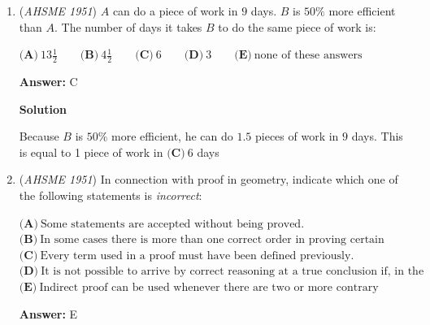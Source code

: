 \begin{enumerate}
\textbf{Solution 1}

At $2:15$, the minute hand points directly at $3$, while the hour hand points $\frac{1}{4}$ of the way from $2$ to $3$.  The angle between any two numbers on the clock is $\frac{360^{\circ}}{12} = 30^{\circ}$, so the angle between the hands at $2:15$ is $\frac{3}{4} \cdot 30^{\circ} = \boxed{\textbf{(C)}\ 22\frac{1}{2}^{\circ}}$.

 



\textbf{Solution 2}

Using the formula $\frac{|60h-11m|}{2}$, where $h$ is the hour time and $m$ is the minute time, we get that the angle is $\frac{|60(2)-11(15)|}{2}=\frac{|120-165|}{2}=\frac{45}{2}=\boxed{\textbf{(C)}\ 22\frac {1}{2}^{\circ} }$



	\item (\textit{AHSME 1951}) $A$ can do a piece of work in $9$ days. $B$ is $50\%$ more efficient than $A$. The number of days it takes $B$ to do the same piece of work is:


 $\textbf{(A)}\ 13\frac {1}{2} \qquad\textbf{(B)}\ 4\frac {1}{2} \qquad\textbf{(C)}\ 6 \qquad\textbf{(D)}\ 3 \qquad\textbf{(E)}\ \text{none of these answers}$

 \textbf{Answer: }C



\textbf{Solution}

Because $B$ is $50\%$ more efficient, he can do $1.5$ pieces of work in $9$ days. This is equal to 1 piece of work in $\textbf{(C)}\ 6$ days

 


	\item (\textit{AHSME 1951}) In connection with proof in geometry, indicate which one of the following statements is \textit{incorrect}: 


 $\textbf{(A)}\ \text{Some statements are accepted without being proved.}$
$\textbf{(B)}\ \text{In some cases there is more than one correct order in proving certain propositions.}$
$\textbf{(C)}\ \text{Every term used in a proof must have been defined previously.}$
$\textbf{(D)}\ \text{It is not possible to arrive by correct reasoning at a true conclusion if, in the given, there is an untrue proposition.}$
$\textbf{(E)}\ \text{Indirect proof can be used whenever there are two or more contrary propositions.}$

 \textbf{Answer: }E




\end{enumerate}
